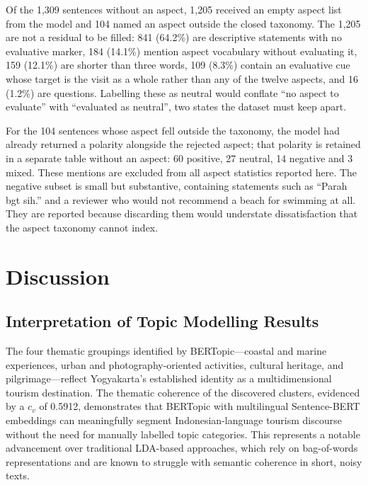 \documentclass[pdflatex,sn-mathphys-num]{sn-jnl}
\begin{document}
Of the 1,309 sentences without an aspect, 1,205 received an empty aspect list from the model and 104 named an aspect outside the closed taxonomy. The 1,205 are not a residual to be filled: 841 (64.2\%) are descriptive statements with no evaluative marker, 184 (14.1\%) mention aspect vocabulary without evaluating it, 159 (12.1\%) are shorter than three words, 109 (8.3\%) contain an evaluative cue whose target is the visit as a whole rather than any of the twelve aspects, and 16 (1.2\%) are questions. Labelling these as neutral would conflate ``no aspect to evaluate'' with ``evaluated as neutral'', two states the dataset must keep apart.

For the 104 sentences whose aspect fell outside the taxonomy, the model had already returned a polarity alongside the rejected aspect; that polarity is retained in a separate table without an aspect: 60 positive, 27 neutral, 14 negative and 3 mixed. These mentions are excluded from all aspect statistics reported here. The negative subset is small but substantive, containing statements such as ``Parah bgt sih.'' and a reviewer who would not recommend a beach for swimming at all. They are reported because discarding them would understate dissatisfaction that the aspect taxonomy cannot index.

\section{Discussion}\label{sec5}

\subsection{Interpretation of Topic Modelling Results}\label{subsec8}

The four thematic groupings identified by BERTopic---coastal and marine experiences, urban and photography-oriented activities, cultural heritage, and pilgrimage---reflect Yogyakarta's established identity as a multidimensional tourism destination. The thematic coherence of the discovered clusters, evidenced by a $c_v$ of 0.5912, demonstrates that BERTopic with multilingual Sentence-BERT embeddings can meaningfully segment Indonesian-language tourism discourse without the need for manually labelled topic categories. This represents a notable advancement over traditional LDA-based approaches, which rely on bag-of-words representations and are known to struggle with semantic coherence in short, noisy texts.
\end{document}
